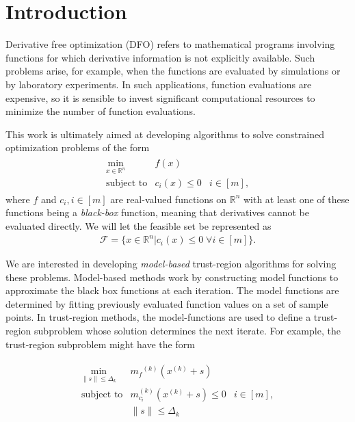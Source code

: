 \documentclass{article}
\theoremstyle{case}
\numberwithin{theorem}{subsection}
\newcommand{\dk}{\Delta_k}
\newcommand{\feasible}{{\mathcal F}}
\newcommand{\mcik}{{{m}^{(k)}_{c_i}}}
\newcommand{\mfk}{{{m}_f}^{(k)}}
\newcommand{\Rn}{\mathbb R^n}
\newcommand{\xk}{x^{(k)}}
\begin{document}
\section{Introduction}

Derivative free optimization (DFO) refers to mathematical programs involving functions for which derivative information is not explicitly available.
Such problems arise, for example, when the functions are evaluated by simulations or by laboratory experiments.
In such applications, function evaluations are expensive, so it is sensible to invest significant computational resources to minimize the number of function evaluations.

This work is ultimately aimed at developing algorithms to solve constrained optimization problems of the form 
\begin{align*}
\begin{array}{ccl} \min_{x \in \Rn} & f(x) \\
\mbox{subject to} & c_i(x) \le 0 & i \in [m],
\end{array}
\end{align*}
where 
$f$ and $c_i, i \in [m]$ are real-valued functions on $\Rn$ with at least one of these functions being a {\em black-box} function, meaning that derivatives cannot be evaluated directly.
We will let the feasible set be represented as 
\begin{align}
\feasible = \{x \in \Rn | c_i(x) \le 0 \; \forall i \in [m] \}. \label{define_feasible}
\end{align}

We are interested in developing {\em model-based} trust-region algorithms for solving these problems.
Model-based methods work by constructing model functions to approximate the black box functions at each iteration.
The model functions are determined by fitting previously evaluated function values on a set of sample points.
In trust-region methods, the model-functions are used to define a trust-region subproblem whose solution determines the next iterate.
For example, the trust-region subproblem might have the form

\begin{align*}
\begin{array}{ccl} \min_{\|s\| \le \dk}
 & \mfk \left(\xk+s\right) \\
\mbox{subject to} & \mcik\left(\xk + s\right) \le 0 & i \in [m], \\
& \|s\| \le \dk \\
\end{array}
\end{align*}
\end{document}
